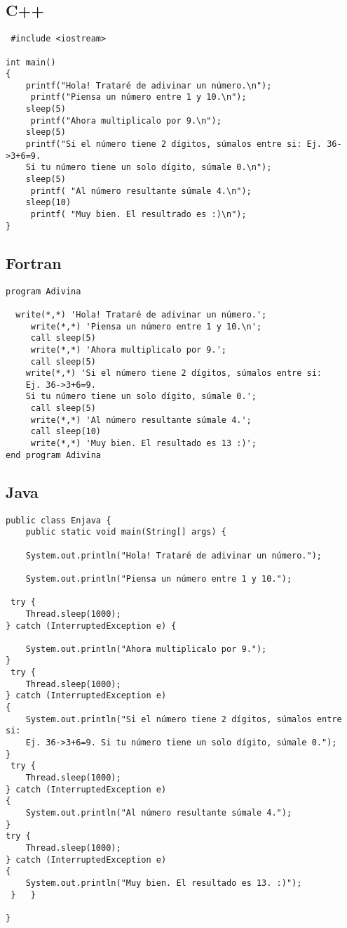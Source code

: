 \documentclass[10pt]{article}
\begin{document}
\subsection{C++}
\begin{verbatim}
 #include <iostream>
 
int main()
{
    printf("Hola! Trataré de adivinar un número.\n");
     printf("Piensa un número entre 1 y 10.\n");
    sleep(5)	
     printf("Ahora multiplicalo por 9.\n");
    sleep(5)
    printf("Si el número tiene 2 dígitos, súmalos entre si: Ej. 36->3+6=9. 
    Si tu número tiene un solo dígito, súmale 0.\n");
    sleep(5)
     printf( "Al número resultante súmale 4.\n");
    sleep(10)	
     printf( "Muy bien. El resultrado es :)\n"); 
} 
\end{verbatim}
\subsection{Fortran}
\begin{verbatim}
program Adivina 

  write(*,*) 'Hola! Trataré de adivinar un número.';
     write(*,*) 'Piensa un número entre 1 y 10.\n';
     call sleep(5)	
     write(*,*) 'Ahora multiplicalo por 9.';
     call sleep(5)
    write(*,*) 'Si el número tiene 2 dígitos, súmalos entre si: 
    Ej. 36->3+6=9. 
    Si tu número tiene un solo dígito, súmale 0.';
     call sleep(5)
     write(*,*) 'Al número resultante súmale 4.';
     call sleep(10)	
     write(*,*) 'Muy bien. El resultado es 13 :)'; 
end program Adivina
\end{verbatim}
\subsection{Java}
\begin{verbatim}
public class Enjava {
    public static void main(String[] args) {
    
    System.out.println("Hola! Trataré de adivinar un número.");

    System.out.println("Piensa un número entre 1 y 10.");

 try {
    Thread.sleep(1000);
} catch (InterruptedException e) {

    System.out.println("Ahora multiplicalo por 9.");
}
 try {
    Thread.sleep(1000);
} catch (InterruptedException e)
{
    System.out.println("Si el número tiene 2 dígitos, súmalos entre si: 
    Ej. 36->3+6=9. Si tu número tiene un solo dígito, súmale 0.");
}
 try {
    Thread.sleep(1000);
} catch (InterruptedException e)
{
    System.out.println("Al número resultante súmale 4.");
}
try {
    Thread.sleep(1000);
} catch (InterruptedException e)
{
    System.out.println("Muy bien. El resultado es 13. :)"); 
 }   }

}
\end{verbatim}
\end{document}
